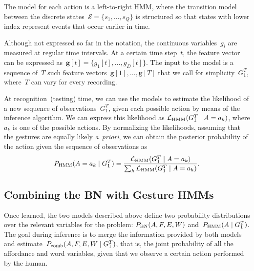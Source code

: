 The model for each action is a
left-to-right \ac{HMM}, where the transition model between the discrete states~$\mathcal{S} = \{s_1, \dots, s_Q\}$ is structured so that states with lower index represent events that occur earlier in time.

Although not expressed so far in the notation, the continuous variables~$g_i$ are measured at regular time intervals.
At a certain time step~$t$, the feature vector can be expressed as~$\bm{g}[t] = \{g_1[t], \dots, g_D[t]\}$.
The input to the model is a sequence of~$T$ such feature vectors~$\bm{g}[1], \dots, \bm{g}[T]$ that we call for simplicity~$G_1^T$, where~$T$ can vary for every recording.

At recognition~(testing) time, we can use the models to estimate the likelihood of a new sequence of observations~$G_1^T$, given each possible action by means of the \FB{} inference algorithm.
We can express this likelihood as $\mathcal{L}_\text{HMM}(G_1^T \mid A=a_k)$, where $a_k$ is one of the possible actions.
By normalizing the likelihoods, assuming that the gestures are equally likely \emph{a~priori}, we can obtain the posterior probability of the action given the sequence of observations as
\begin{equation} \label{eq:phmm_action}
  \phmm(A=a_k \given G_1^T) = \frac{\mathcal{L}_\text{HMM}(G_1^T \given A=a_k)}{\sum_h \mathcal{L}_\text{HMM}(G_1^T \given A=a_h)}.
\end{equation}

\subsection{Combining the \acs{BN} with Gesture \acsp{HMM}}
\label{sec:combination}
Once learned, the two models described above define two probability distributions over the relevant variables for the problem:
$P_{\text{BN}}(A, F, E, W)$ and~$P_{\text{HMM}}(A \mid G_1^T)$.
The goal during inference is to merge the information provided by both models and estimate~$P_\text{comb}(A, F, E, W \mid G_1^T)$, that is, the joint probability of all the affordance and word variables, given that we observe a certain action performed by the human.

